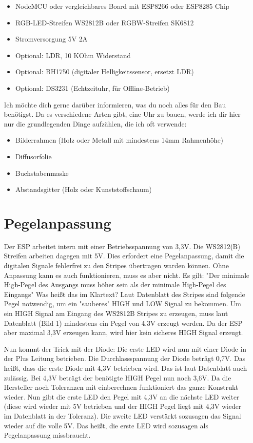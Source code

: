 \documentclass[12pt,a4paper, german,oneside, headinclude, headsepline,plainheadsepline,BCOR20mm, DIV18,parskip=half, openright, numbers=noenddot, captions=tableheading,version=first,listof=totoc,version=first]{scrbook}
\begin{document}
\begin{itemize}
    \item NodeMCU oder vergleichbares Board mit ESP8266 oder ESP8285 Chip
    \item RGB-LED-Streifen WS2812B oder RGBW-Streifen SK6812
    \item Stromversorgung 5V 2A
    \item Optional: LDR, 10 KOhm Widerstand
    \item Optional: BH1750 (digitaler Helligkeitssensor, ersetzt LDR)
    \item Optional: DS3231 (Echtzeituhr, für Offline-Betrieb)
\end{itemize}

Ich möchte dich gerne darüber informieren, was du noch alles für den Bau benötigst. Da es verschiedene Arten gibt, eine Uhr zu bauen, werde ich dir hier nur die grundlegenden Dinge aufzählen, die ich oft verwende:

\begin{itemize}
    \item Bilderrahmen (Holz oder Metall mit mindestens 14mm Rahmenhöhe)
    \item Diffusorfolie
    \item Buchstabenmaske
    \item Abstandsgitter (Holz oder Kunststoffschaum)
\end{itemize}

\section{Pegelanpassung}

Der ESP arbeitet intern mit einer Betriebsspannung von 3,3V. Die WS2812(B) Streifen arbeiten dagegen mit 5V. Dies erfordert eine Pegelanpassung, damit die digitalen Signale fehlerfrei zu den Stripes übertragen warden können. Ohne Anpassung kann es auch funktionieren, muss es aber nicht. 
Es gilt: "Der minimale High-Pegel des Ausgangs muss höher sein als der minimale High-Pegel des Eingangs"
Was heißt das im Klartext?
Laut Datenblatt des Stripes sind folgende Pegel notwendig, um ein "sauberes" HIGH und LOW Signal zu bekommen.
Um ein HIGH Signal am Eingang des WS2812B Stripes zu erzeugen, muss laut Datenblatt (Bild 1) mindestens ein Pegel von 4,3V erzeugt werden. Da der ESP aber maximal 3,3V erzeugen kann, wird hier kein sicheres HIGH Signal erzeugt.

Nun kommt der Trick mit der Diode:
Die erste LED wird nun mit einer Diode in der Plus Leitung betrieben. Die Durchlassspannung der Diode beträgt 0,7V. Das heißt, dass die erste Diode mit 4,3V betrieben wird. Das ist laut Datenblatt auch zulässig. Bei 4,3V beträgt der benötigte HIGH Pegel nun noch 3,6V. Da die Hersteller noch Toleranzen mit einberechnen funktioniert das ganze Konstrukt wieder. Nun gibt die erste LED den Pegel mit 4,3V an die nächste LED weiter (diese wird wieder mit 5V betrieben und der HIGH Pegel liegt mit 4,3V wieder im Datenblatt in der Toleranz). Die zweite LED verstärkt sozusagen das Signal wieder auf die volle 5V.
Das heißt, die erste LED wird sozusagen als Pegelanpassung missbraucht.
\end{document}
